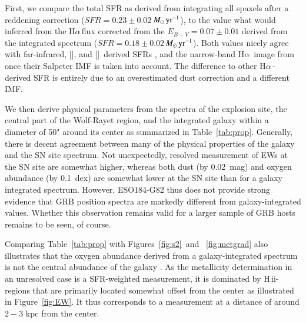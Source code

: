 \documentclass[traditabstract]{aa}
\newcommand{\ha}{H$\alpha$}
\newcommand{\hii}{\mbox{H\,{\sc ii}}}
\newcommand{\oi}{[\ion{O}{i}]}
\newcommand{\cii}{[\ion{C}{ii}]}
\newcommand{\Msunyr}{$M_\odot\,\rm{yr}^{-1}$}
\begin{document}
First, we compare the total SFR as derived from integrating all spaxels after a reddening correction ($SFR=0.23\pm0.02$\,\Msunyr), to the value what would inferred from the \ha\,flux corrected from the $E_{B-V}=0.07\pm0.01$ derived from the integrated spectrum ($SFR=0.18\pm0.02$\,\Msunyr). Both values nicely agree with far-infrared, \oi, and \cii\, derived SFRs \citep{2014A&A...562A..70M, 2016arXiv160901742M}, and the narrow-band \ha\, image from \citet{2005NewA...11..103S} once their Salpeter IMF is taken into account. The difference to other \ha\,-derived SFR \citep{2006A&A...454..103H, 2008A&A...490...45C} is entirely due to an overestimated dust correction and a different IMF.

We then derive physical parameters from the spectra of the explosion site, the central part of the Wolf-Rayet region, and the integrated galaxy within a diameter of 50" around its center as summarized in Table~\ref{tab:prop}. Generally, there is decent agreement between many of the physical properties of the galaxy and the SN site spectrum. Not unexpectedly, resolved measurement of EWs at the SN site are somewhat higher, whereas both dust (by 0.02~mag) and oxygen abundance (by 0.1~dex) are somewhat lower at the SN site than for a galaxy integrated spectrum. However, ESO184-G82 thus does not provide strong evidence that GRB position spectra are markedly different from galaxy-integrated values. Whether this observation remains valid for a larger sample of GRB hosts remains to be seen, of course.

Comparing Table~\ref{tab:prop} with Figures~\ref{fig:s2}~and ~\ref{fig:metgrad} also illustrates that the oxygen abundance derived from a galaxy-integrated spectrum is not the central abundance of the galaxy \citep[see also e.g.,][]{2016A&A...591A..48G}. As the metallicity determination in an unresolved case is a SFR-weighted measurement, it is dominated by \hii-regions that are primarily located somewhat offset from the center as illustrated in Figure~\ref{fig:EW}. It thus corresponds to a measurement at a distance of around $2-3$ kpc from the center. 
\end{document}
